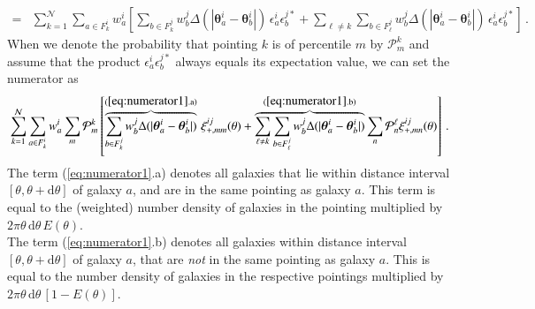 \documentclass{aa}
\renewcommand{\rm}{\mathrm}
\def\b#1{\bm{#1}}
\begin{document}
\begin{appendix}
\begin{align}
  = & \sum_{k=1}^\mathcal{N}\sum_{a\in F_k^i}w_a^i \left[\sum_{b\in F_{k}^j} w_b^j \Delta(|\b\theta_a^i-\b\theta_b^i|)\, \epsilon_a^i\epsilon_b^{j*} + \sum_{\ell\neq k} \sum_{b\in F_{\ell}^j} w_b^j \Delta(|\b\theta_a^i-\b\theta_b^i|)\, \epsilon_a^i\epsilon_b^{j*}\right] \, .
\end{align}
When we denote the probability that pointing $k$ is of percentile $m$ by $\mathcal{P}_m^k$ and assume that the product $\epsilon_a^i\epsilon_b^{j*}$ always equals its expectation value, we can set the numerator as \begin{equation}
\sum_{k=1}^\mathcal{N}\sum_{a\in F_k^i}w_a^i \sum_m \mathcal{P}_m^k \left[\overbrace{\sum_{b\in F_{k}^j} w_b^j \Delta(|\b\theta_a^i-\b\theta_b^i|)}^{\rm{(\ref{eq:numerator1}.a)}}\,  \xi_{+,mm}^{ij}(\theta) + \overbrace{\sum_{\ell\neq k} \sum_{b\in F_{\ell}^j} w_b^j \Delta(|\b\theta_a^i-\b\theta_b^i|)}^{\rm{(\ref{eq:numerator1}.b)}} \sum_n \mathcal{P}_n^{\ell} \xi_{+,mn}^{ij}(\theta)\right] \, .
\label{eq:numerator1}
\end{equation}
The term (\ref{eq:numerator1}.a) denotes all galaxies that lie within distance interval $[\theta,\theta+{\rm d}\theta]$ of galaxy $a$, and are in the same pointing as galaxy $a$. This term is equal to the (weighted) number density of galaxies in the pointing multiplied by $2\pi\theta\, {\rm d}\theta\, E(\theta)$. \\
The term (\ref{eq:numerator1}.b) denotes all galaxies within distance interval $[\theta,\theta+{\rm d}\theta]$ of galaxy $a$, that are \textit{not} in the same pointing as galaxy $a$. This is equal to the number density of galaxies in the respective pointings multiplied by $2\pi\theta\, {\rm d}\theta\, [1-E(\theta)]$. 
 

\end{appendix}
\end{document}

